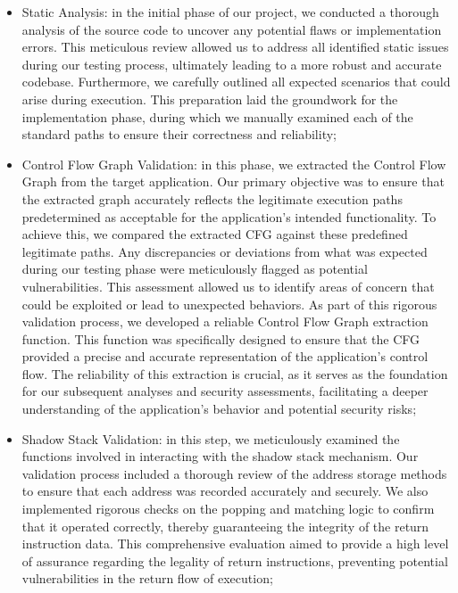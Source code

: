 \begin{itemize}
  \item Static Analysis: in the initial phase of our project, we conducted a thorough
    analysis of the source code to uncover any potential flaws or implementation
    errors. This meticulous review allowed us to address all identified static
    issues during our testing process, ultimately leading to a more robust and accurate
    codebase. Furthermore, we carefully outlined all expected scenarios that could
    arise during execution. This preparation laid the groundwork for the
    implementation phase, during which we manually examined each of the standard
    paths to ensure their correctness and reliability;

  \item Control Flow Graph Validation: in this phase, we extracted the Control Flow
    Graph from the target application. Our primary objective was to ensure that
    the extracted graph accurately reflects the legitimate execution paths
    predetermined as acceptable for the application's intended functionality. To
    achieve this, we compared the extracted CFG against these predefined
    legitimate paths. Any discrepancies or deviations from what was expected during
    our testing phase were meticulously flagged as potential vulnerabilities.
    This assessment allowed us to identify areas of concern that could be
    exploited or lead to unexpected behaviors. As part of this rigorous validation
    process, we developed a reliable Control Flow Graph extraction function. This
    function was specifically designed to ensure that the CFG provided a precise
    and accurate representation of the application's control flow. The
    reliability of this extraction is crucial, as it serves as the foundation for
    our subsequent analyses and security assessments, facilitating a deeper
    understanding of the application's behavior and potential security risks;

  \item Shadow Stack Validation: in this step, we meticulously examined the functions
    involved in interacting with the shadow stack mechanism. Our validation
    process included a thorough review of the address storage methods to ensure
    that each address was recorded accurately and securely. We also implemented rigorous
    checks on the popping and matching logic to confirm that it operated correctly,
    thereby guaranteeing the integrity of the return instruction data. This comprehensive
    evaluation aimed to provide a high level of assurance regarding the legality
    of return instructions, preventing potential vulnerabilities in the return
    flow of execution;


\end{itemize}
